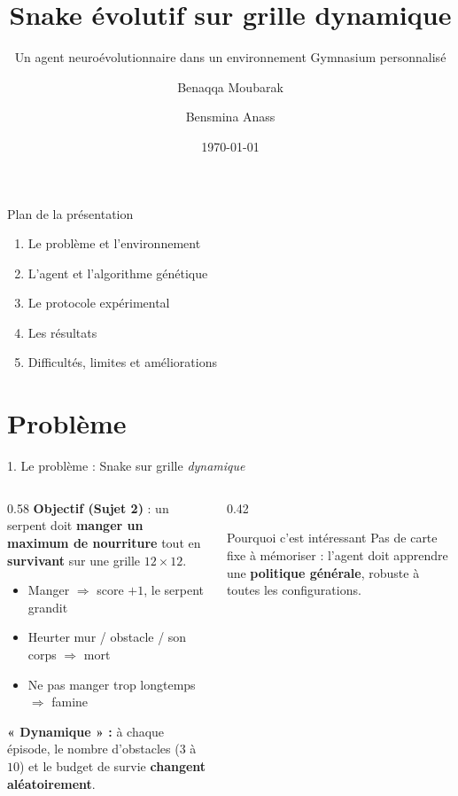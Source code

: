 \documentclass[11pt,aspectratio=169]{beamer}
\title[Snake évolutif (Sujet 2)]{Snake évolutif sur grille dynamique}
\subtitle{Un agent neuroévolutionnaire dans un environnement Gymnasium personnalisé}
\author[Benaqqa \& Bensmina]{Benaqqa Moubarak \and Bensmina Anass}
\institute[ENSIAS]{ENSIAS --- Module M2442 « Jeux Vidéo IA »}
\date{\today}
\begin{document}
\begin{frame}[plain]
  \titlepage
\end{frame}

\begin{frame}{Plan de la présentation}
  \begin{enumerate}
    \item Le problème et l'environnement
    \item L'agent et l'algorithme génétique
    \item Le protocole expérimental
    \item Les résultats
    \item Difficultés, limites et améliorations
  \end{enumerate}
\end{frame}

\section{Problème}

\begin{frame}{1. Le problème : Snake sur grille \emph{dynamique}}
  \begin{columns}
    \begin{column}{0.58\textwidth}
      \textbf{Objectif (Sujet 2)} : un serpent doit \textbf{manger un maximum
      de nourriture} tout en \textbf{survivant} sur une grille $12\times12$.
      \medskip
      \begin{itemize}
        \item Manger $\Rightarrow$ score $+1$, le serpent grandit
        \item Heurter mur / obstacle / son corps $\Rightarrow$ mort
        \item Ne pas manger trop longtemps $\Rightarrow$ famine
      \end{itemize}
      \medskip
      \textbf{« Dynamique » :} à chaque épisode, le nombre d'obstacles
      ($3$ à $10$) et le budget de survie \textbf{changent aléatoirement}.
    \end{column}
    \begin{column}{0.42\textwidth}
      \begin{block}{Pourquoi c'est intéressant}
        Pas de carte fixe à mémoriser : l'agent doit apprendre une
        \textbf{politique générale}, robuste à toutes les configurations.
      \end{block}
    \end{column}
  \end{columns}
\end{frame}
\end{document}
